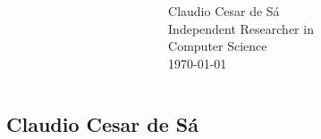 \documentclass{beamer}
\begin{document}
\begin{frame}
\begin{columns}[T]
\begin{column}{.6\textwidth}
\begin{block}{}
    \end{block}
    \end{column}
    \begin{column}{.5\textwidth}
    \begin{block}{}
    \vskip 2cm
    {\Large Claudio Cesar de Sá}\\
    {\large Independent Researcher in}\\
    {\large Computer Science}\\
     \today
    \end{block}
    \end{column}
  \end{columns}
\end{frame}







\subsection{Claudio Cesar de Sá}
\end{document}
